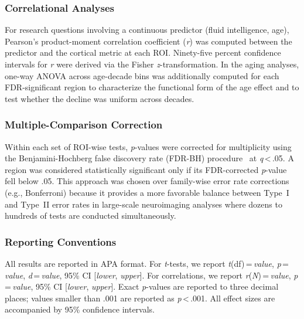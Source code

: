 \subsubsection{Correlational Analyses}

For research questions involving a continuous predictor (fluid intelligence, age), Pearson's product-moment correlation coefficient (\textit{r}) was computed between the predictor and the cortical metric at each ROI.
Ninety-five percent confidence intervals for \textit{r} were derived via the Fisher \textit{z}-transformation.
In the aging analyses, one-way ANOVA across age-decade bins was additionally computed for each FDR-significant region to characterize the functional form of the age effect and to test whether the decline was uniform across decades.

\subsubsection{Multiple-Comparison Correction}

Within each set of ROI-wise tests, \textit{p}-values were corrected for multiplicity using the Benjamini-Hochberg false discovery rate (FDR-BH) procedure~\cite{benjamini1995controlling} at \textit{q}\,<\,.05.
A region was considered statistically significant only if its FDR-corrected \textit{p}-value fell below .05.
This approach was chosen over family-wise error rate corrections (e.g., Bonferroni) because it provides a more favorable balance between Type~I and Type~II error rates in large-scale neuroimaging analyses where dozens to hundreds of tests are conducted simultaneously.

\subsubsection{Reporting Conventions}

All results are reported in APA format.
For \textit{t}-tests, we report \textit{t}(df)\,=\,\textit{value}, \textit{p}\,=\,\textit{value}, \textit{d}\,=\,\textit{value}, 95\% CI [\textit{lower}, \textit{upper}].
For correlations, we report \textit{r}(\textit{N})\,=\,\textit{value}, \textit{p}\,=\,\textit{value}, 95\% CI [\textit{lower}, \textit{upper}].
Exact \textit{p}-values are reported to three decimal places; values smaller than .001 are reported as \textit{p}\,<\,.001.
All effect sizes are accompanied by 95\% confidence intervals.
